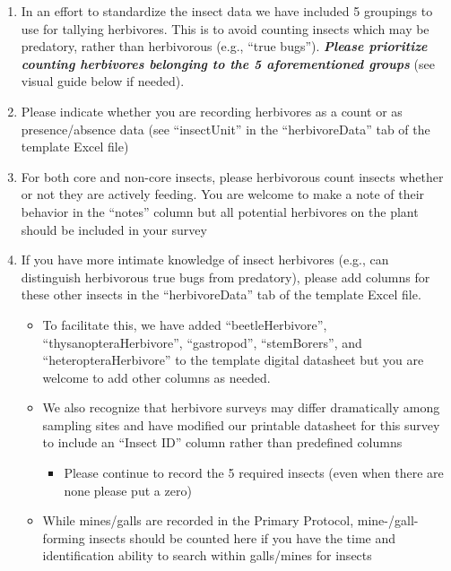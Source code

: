 \documentclass[
  letterpaper,
  oneside,
  open=any]{scrbook}
\providecommand{\tightlist}{%
  \setlength{\itemsep}{0pt}\setlength{\parskip}{0pt}}\usepackage{longtable,booktabs,array}
\begin{document}
\begin{enumerate}
\def\labelenumi{\arabic{enumi}.}
\item
  In an effort to standardize the insect data we have included 5
  groupings to use for tallying herbivores. This is to avoid counting
  insects which may be predatory, rather than herbivorous (e.g., ``true
  bugs''). \textbf{\emph{Please prioritize counting herbivores belonging
  to the 5 aforementioned groups}} (see visual guide below if needed).
\item
  Please indicate whether you are recording herbivores as a count or as
  presence/absence data (see ``insectUnit'' in the ``herbivoreData'' tab
  of the template Excel file)
\item
  For both core and non-core insects, please herbivorous count insects
  whether or not they are actively feeding. You are welcome to make a
  note of their behavior in the ``notes'' column but all potential
  herbivores on the plant should be included in your survey
\item
  If you have more intimate knowledge of insect herbivores (e.g., can
  distinguish herbivorous true bugs from predatory), please add columns
  for these other insects in the ``herbivoreData'' tab of the template
  Excel file.

  \begin{itemize}
  \item
    To facilitate this, we have added ``beetleHerbivore'',
    ``thysanopteraHerbivore'', ``gastropod'', ``stemBorers'', and
    ``heteropteraHerbivore'' to the template digital datasheet but you
    are welcome to add other columns as needed.
  \item
    We also recognize that herbivore surveys may differ dramatically
    among sampling sites and have modified our printable datasheet for
    this survey to include an ``Insect ID'' column rather than
    predefined columns

    \begin{itemize}
    \tightlist
    \item
      Please continue to record the 5 required insects (even when there
      are none please put a zero)
    \end{itemize}
  \item
    While mines/galls are recorded in the Primary Protocol,
    mine-/gall-forming insects should be counted here if you have the
    time and identification ability to search within galls/mines for
    insects
  \end{itemize}
\end{enumerate}
\end{document}
